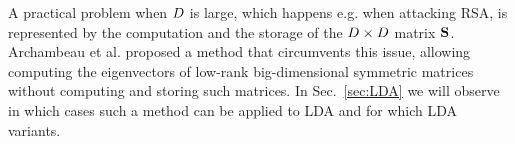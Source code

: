 A practical problem when $D$ is large, which happens e.g. when attacking RSA, is represented by the computation and the storage of the $D\times D$ matrix $\textbf{S}$. Archambeau et al. \cite{TAprincipal} proposed a method that circumvents this issue, allowing computing the eigenvectors of low-rank big-dimensional symmetric matrices without computing and storing such matrices. In Sec.~\ref{sec:LDA} we will observe in which cases such a method can be applied to LDA and for which LDA variants.



